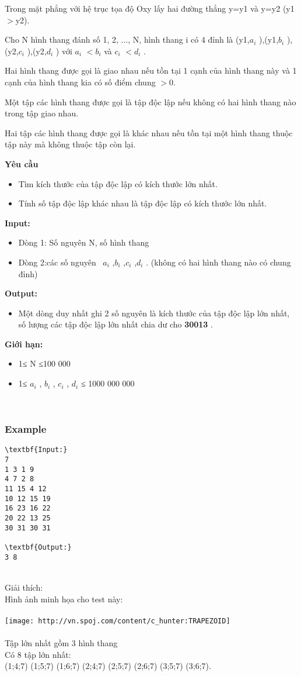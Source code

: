 

Trong mặt phẳng với hệ trục tọa độ Oxy lấy hai đường thẳng y=y1 và y=y2 (y1$>$y2).

Cho N hình thang đánh số 1, 2, ..., N, hình thang i có 4 đỉnh là (y1,$a_{i}$ ),(y1,$b_{i}$ ),(y2,$c_{i}$ ),(y2,$d_{i}$ ) với $a_{i}$ $<$$b_{i}$ và $c_{i}$ $<$$d_{i}$ .

Hai hình thang được gọi là giao nhau nếu tồn tại 1 cạnh của hình thang này và 1 cạnh của hình thang kia có số điểm chung $>$0.

Một tập các hình thang được gọi là tập độc lập nếu không có hai hình thang nào trong tập giao nhau.

Hai tập các hình thang được gọi là khác nhau nếu tồn tại một hình thang thuộc tập này mà không thuộc tập còn lại.

\textbf{Yêu cầu}
\begin{itemize}
	\item Tìm kích thước của tập độc lập có kích thước lớn nhất.
	\item Tính số tập độc lập khác nhau là tập độc lập có kích thước lớn nhất.
\end{itemize}

\textbf{Input: }
\begin{itemize}
	\item Dòng 1: Số nguyên N, số hình thang
	\item Dòng 2:các số nguyên  $a_{i}$ ,$b_{i}$ ,$c_{i}$ ,$d_{i}$ . (không có hai hình thang nào có chung đỉnh)
\end{itemize}

\textbf{Output: }
\begin{itemize}
	\item Một dòng duy nhất ghi 2 số nguyên là kích thước của tập độc lập lớn nhất, số lượng các tập độc lập lớn nhất chia dư cho \textbf{ 30013 } .
\end{itemize}

\textbf{Giới hạn: }
\begin{itemize}
	\item 1≤ N ≤100 000
	\item 1≤ $a_{i}$ , $b_{i}$ , $c_{i}$ , $d_{i}$ ≤ 1000 000 000
\end{itemize}

 

\subsubsection{Example}
\begin{verbatim}
\textbf{Input:}
7
1 3 1 9
4 7 2 8
11 15 4 12
10 12 15 19
16 23 16 22
20 22 13 25
30 31 30 31

\textbf{Output:}
3 8\end{verbatim}


\\Giải thích:
\\Hình ảnh minh họa cho test này:
\\
\\
\texttt{[image: http://vn.spoj.com/content/c\_hunter:TRAPEZOID]}
\\
\\Tập lớn nhất gồm 3 hình thang
\\Có 8 tập lớn nhất:
\\(1;4;7) (1;5;7) (1;6;7) (2;4;7) (2;5;7) (2;6;7) (3;5;7) (3;6;7).
